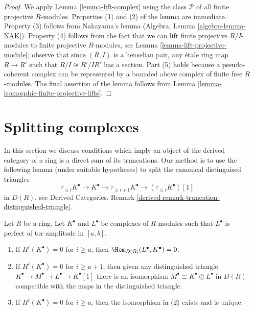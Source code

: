 \begin{proof}
We apply Lemma \ref{lemma-lift-complex} using the class $\mathcal{P}$
of all finite projective $R$-modules. Properties (1) and (2)
of the lemma are immediate.
Property (3) follows from Nakayama's lemma
(Algebra, Lemma \ref{algebra-lemma-NAK}).
Property (4) follows from the fact that we can lift finite projective
$R/I$-modules to finite projective $R$-modules, see
Lemma \ref{lemma-lift-projective-module}; observe that since
$(R, I)$ is a henselian pair, any \'etale ring map $R \to R'$
such that $R/I \cong R'/IR'$ has a section.
Part (5) holds because a pseudo-coherent complex can be represented
by a bounded above complex of finite free $R$-modules.
The final assertion of the lemma follows from
Lemma \ref{lemma-isomorphic-finite-projective-lifts}.
\end{proof}



\section{Splitting complexes}
\label{section-splitting}

\noindent
In this section we discuss conditions which imply an object of the
derived category of a ring is a direct sum of its truncations.
Our method is to use the following lemma (under suitable hypotheses)
to split the canonical distinguised triangles
$$
\tau_{\leq i}K^\bullet \to K^\bullet \to \tau_{\geq i + 1}K^\bullet \to
(\tau_{\leq i}K^\bullet)[1]
$$
in $D(R)$, see Derived Categories, Remark
\ref{derived-remark-truncation-distinguished-triangle}.

\begin{lemma}
\label{lemma-splitting-unique}
Let $R$ be a ring. Let $K^\bullet$ and $L^\bullet$ be complexes
of $R$-modules such that $L^\bullet$ is perfect of tor-amplitude
in $[a, b]$.
\begin{enumerate}
\item If $H^i(K^\bullet) = 0$ for $i \geq a$, then
$\Hom_{D(R)}(L^\bullet, K^\bullet) = 0$.
\item If $H^i(K^\bullet) = 0$ for $i \geq a + 1$, then given any distinguished
triangle $K^\bullet \to M^\bullet \to L^\bullet \to K^\bullet[1]$
there is an isomorphism $M^\bullet \cong K^\bullet \oplus L^\bullet$
in $D(R)$ compatible with the maps in the distinguished triangle.
\item If $H^i(K^\bullet) = 0$ for $i \geq a$, then the isomorphism
in (2) exists and is unique.
\end{enumerate}
\end{lemma}

